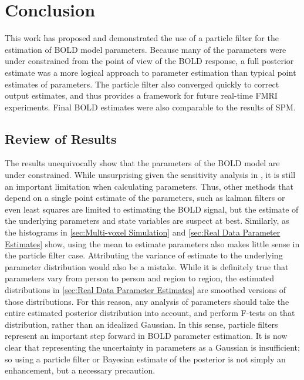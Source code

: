\chapter{Conclusion}
\label{sec:Conclusion}
This work has proposed and demonstrated the use of a particle filter
for the estimation of BOLD model parameters. Because many of the parameters
were under constrained from the point of view of the BOLD response, a
full posterior estimate was a more logical approach to parameter estimation
than typical point estimates of parameters. The particle filter also converged
quickly to correct output estimates, and thus provides a framework
for future real-time FMRI experiments. Final BOLD estimates were also comparable
to the results of SPM. 

\section{Review of Results}
The results unequivocally show that the parameters of the BOLD model are under
constrained. While unsurprising given the sensitivity analysis in \cite{Deneux2006},
it is still an important limitation when calculating parameters. Thus, other methods
that depend on a single point estimate of the parameters, such as kalman filters
or even least squares are limited to estimating the BOLD signal, but the estimate
of the underlying parameters and state variables are suspect at best. Similarly, as the
histograms in \autoref{sec:Multi-voxel Simulation} and \autoref{sec:Real Data Parameter Estimates}
show, using the mean to estimate parameters also makes little sense in the particle filter
case. Attributing the variance of estimate to the underlying parameter distribution would
also be a mistake. While it is definitely true that parameters vary from person to person
and region to region, the estimated distributions in \autoref{sec:Real Data Parameter Estimates} 
are smoothed versions of those distributions. For this reason, any analysis of parameters should
take the entire estimated posterior distribution into account, and perform F-tests on that
distribution, rather than an idealized Gaussian. In this sense, particle filters represent
an important step forward in BOLD parameter estimation. It is now clear that representing
the uncertainty in parameters as a Gaussian is insufficient; so using a particle filter
or Bayesian estimate of the posterior is not simply an enhancement, but a necessary precaution.

